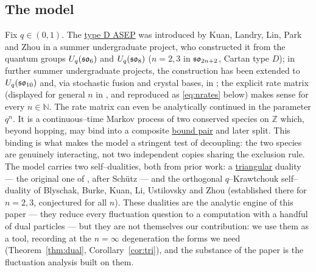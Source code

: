 \documentclass[11pt]{article}
\theoremstyle{plain}
\theoremstyle{definition}
\theoremstyle{remark}
\newcommand{\Z}{\mathbb{Z}}\newcommand{\R}{\mathbb{R}}\newcommand{\N}{\mathbb{N}}
\begin{document}
  

\subsection{The model}\label{sec:intromodel}
Fix $q\in(0,1)$. The \underline{type D ASEP} was introduced by Kuan, Landry, Lin, Park and
Zhou \cite{KLLPZ} in a summer undergraduate project, who constructed it from the quantum groups $U_q(\mathfrak{so}_6)$ and
$U_q(\mathfrak{so}_8)$ ($n=2,3$ in $\mathfrak{so}_{2n+2}$, Cartan type $D$); in further summer undergraduate projects, the construction has been extended to $U_q(\mathfrak{so}_{10})$ \cite{RSL} and, via stochastic fusion and crystal bases, in
\cite{BEPS}; the explicit rate matrix (displayed for general $n$ in \cite[\S2.1]{REU},
and reproduced as \eqref{eq:nrates} below) makes sense for every $n\in\N$. The rate matrix can even be analytically continued in the parameter $q^n$. It is a continuous--time Markov process of two conserved species on $\Z$ which, beyond
hopping, may bind into a composite \underline{bound pair} and later split. This binding is
what makes the model a stringent test of decoupling: the two species are genuinely
interacting, not two independent copies sharing the exclusion rule. The model carries
two self--dualities, both from prior work: a \underline{triangular} duality --- the
original one of \cite{KLLPZ}, after Sch\"utz \cite{SchutzDual} --- and the orthogonal
$q$--Krawtchouk self--duality of Blyschak, Burke, Kuan, Li, Ustilovsky and Zhou
\cite{REU} (established there for $n=2,3$, conjectured for all $n$). These dualities
are the analytic engine of this paper --- they reduce every fluctuation question to a
computation with a handful of dual particles --- but they are not themselves our
contribution: we use them as a tool, recording at the $n=\infty$ degeneration the
forms we need (Theorem~\ref{thm:dual}, Corollary~\ref{cor:tri}), and the substance of
the paper is the fluctuation analysis built on them.
\end{document}

